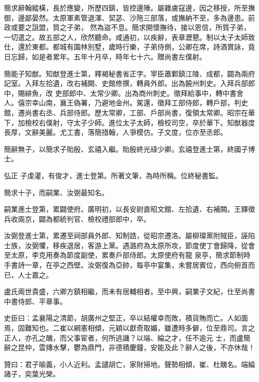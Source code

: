 \begin{pinyinscope}
 簡求辭翰縱橫，長於應變，所歷四鎮，皆控邊陲。屬雜虜寇邊，因之移授，所至撫御，邊鄙晏然。太原軍素管退渾、契苾、沙陁三部落，或撫納不至，多為邊患。前政或要之詛盟，質之子弟，
 然為盜不息。簡求開懷撫待，接以恩信，所質子弟，一切遣之。故五部之人，欣然聽命。咸通初，以疾辭，表章瀝懇。制以太子太師致仕，還於東都。都城有園林別墅，歲時行樂，子弟侍側，公卿在席，詩酒賞詠，竟日忘歸，如是者累年。五年十月卒，時年七十六。贈尚書左僕射。



 簡能子知猷。知猷登進士第，釋褐秘書省正字。宰臣蕭鄴鎮江陵、成都，闢為兩府記室。入拜左拾遺，改右補闕、史館修撰，轉員外郎。出為饒州刺史。入拜兵部郎中，賜緋魚，改
 吏部郎中、太常少卿。出為商州刺史。徵拜給事中，轉中書舍人。僖宗幸山南，襄王偽署，乃避地金州。駕還，徵拜工部侍郎，轉戶部，判史館，遷尚書右丞、兵部侍郎。歷太常卿，工部、戶部尚書，復領太常卿。昭宗在華下，加檢校右僕射，守太子少師。進位太子太師，檢校司空，卒於華下。知猷器度長厚，文辭美麗。尤工書，落簡措翰，人爭模仿。子文度，位亦至丞郎。



 簡辭無子，以簡求子貽殷、玄禧入繼。貽殷終光祿少卿。玄禧登進士第，終國子博士。



 弘正
 子虔灌，有俊才，進士登第。所著文筆，為時所稱。位終秘書監。



 簡求十子，而嗣業、汝弼最知名。



 嗣業進士登第，累闢使府。廣明初，以長安尉直昭文館、左拾遺、右補闕。王鐸徵兵收兩京，闢為都統判官、檢校禮部郎中，卒。



 汝弼登進士第，累遷至祠部員外郎、知制誥，從昭宗遷洛。屬柳璨黨附賊臣，誣陷士族，汝弼懼，移疾退居，客游上黨。遇潞府為太原所攻，節度使丁會歸降，從會至太原，李克用奏為節度副使，累奏戶部侍郎。太原使府有龍
 泉亭，簡求節制時手書詩一章，在亭之西壁。汝弼復為亞帥，每亭中宴集，未嘗居賓位，西向俯首而已，人士嘉之。



 盧氏兩世貴盛，六卿方鎮相繼，而未有居輔相者。至中興，嗣業子文紀，仕至尚書中書侍郎、平章事。



 史臣曰：孟襄陽之清節，胡廣州之堅正，卒以結權幸而敗，積貨賄而亡。人如面焉，固難知也。二崔以綱憲相傾，元穎以獻奇取媚，雖遭時多僻，位至鼎司。言之正人，亦孔之醜，而父事宦者，何所逃譏？以端、綸之才，任不逾元
 士，而盧簡辭之昆仲，雲摶水擊，鬱為鼎門，非德積慶鐘，安能及此？辭人之後，不亦休哉！



 贊曰：君子喻義，小人近利。孟譴胡亡，家財掃地。聲勢相傾，崔、杜醜名。端綸諸子，奕葉光榮。



\end{pinyinscope}